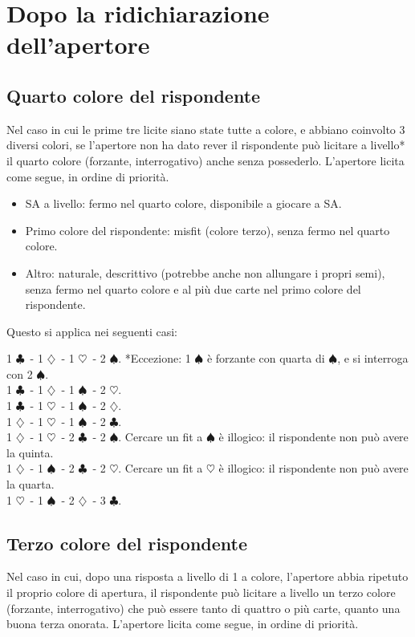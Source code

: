 \documentclass[a4paper,10pt]{article}
\renewcommand{\c}{$\clubsuit$\xspace}
\renewcommand{\d}{$\diamondsuit$\xspace}
\newcommand{\h}{$\heartsuit$\xspace}
\newcommand{\s}{$\spadesuit$\xspace}
\newcommand{\sa}{SA\xspace}
\begin{document}
\pagebreak

\section{Dopo la ridichiarazione dell'apertore}

\subsection{Quarto colore del rispondente}

Nel caso in cui le prime tre licite siano state tutte a colore, e abbiano coinvolto 3 diversi colori, se l'apertore non ha dato rever il rispondente può licitare a livello* il quarto colore (forzante, interrogativo) anche senza possederlo. L'apertore licita come segue, in ordine di priorità.

\begin{itemize}
 \item \sa a livello: fermo nel quarto colore, disponibile a giocare a \sa.
 \item Primo colore del rispondente: misfit (colore terzo), senza fermo nel quarto colore.
 \item Altro: naturale, descrittivo (potrebbe anche non allungare i propri semi), senza fermo nel quarto colore e al più due carte nel primo colore del rispondente.
\end{itemize}

Questo si applica nei seguenti casi:

1 \c\ - 1 \d\ - 1 \h\ - 2 \s. *Eccezione: 1 \s è forzante con quarta di \s, e si interroga con 2 \s.\\
1 \c\ - 1 \d\ - 1 \s\ - 2 \h.\\
1 \c\ - 1 \h\ - 1 \s\ - 2 \d.\\
1 \d\ - 1 \h\ - 1 \s\ - 2 \c.\\
1 \d\ - 1 \h\ - 2 \c\ - 2 \s. Cercare un fit a \s è illogico: il rispondente non può avere la quinta.\\
1 \d\ - 1 \s\ - 2 \c\ - 2 \h. Cercare un fit a \h è illogico: il rispondente non può avere la quarta.\\
1 \h\ - 1 \s\ - 2 \d\ - 3 \c.

\subsection{Terzo colore del rispondente}

Nel caso in cui, dopo una risposta a livello di 1 a colore, l'apertore abbia ripetuto il proprio colore di apertura, il rispondente può licitare a livello un terzo colore (forzante, interrogativo) che può essere tanto di quattro o più carte, quanto una buona terza onorata. L'apertore licita come segue, in ordine di priorità.
\end{document}
